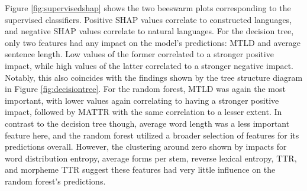 \documentclass[12pt,a4paper]{article}
\numberwithin{figure}{section}
\numberwithin{table}{section}
\numberwithin{definition}{section}
\begin{document}
Figure \ref{fig:supervisedshap} shows the two beeswarm plots corresponding to the supervised classifiers. Positive SHAP values correlate to constructed languages, and negative SHAP values correlate to natural languages. For the decision tree, only two features had any impact on the model's predictions: MTLD and average sentence length. Low values of the former correlated to a stronger positive impact, while high values of the latter correlated to a stronger negative impact. Notably, this also coincides with the findings shown by the tree structure diagram in Figure \ref{fig:decisiontree}. For the random forest, MTLD was again the most important, with lower values again correlating to having a stronger positive impact, followed by MATTR with the same correlation to a lesser extent. In contrast to the decision tree though, average word length was a less important feature here, and the random forest utilized a broader selection of features for its predictions overall. However, the clustering around zero shown by impacts for word distribution entropy, average forms per stem, reverse lexical entropy, TTR, and morpheme TTR suggest these features had very little influence on the random forest's predictions.
\end{document}
